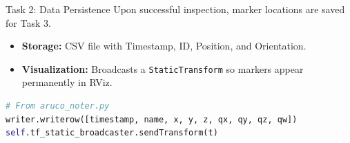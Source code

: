 \begin{frame}[fragile]{Task 2: Data Persistence}
    Upon successful inspection, marker locations are saved for Task 3.
    \begin{itemize}
        \item \textbf{Storage:} CSV file with Timestamp, ID, Position, and Orientation.
        \item \textbf{Visualization:} Broadcasts a \texttt{StaticTransform} so markers appear permanently in RViz.
    \end{itemize}
    \begin{lstlisting}[language=Python]
# From aruco_noter.py
writer.writerow([timestamp, name, x, y, z, qx, qy, qz, qw])
self.tf_static_broadcaster.sendTransform(t)
    \end{lstlisting}
\end{frame}